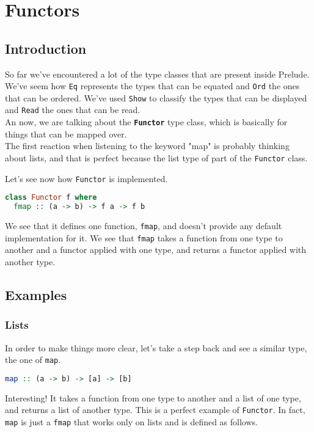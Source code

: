 \newpage
\chapter{Functors}
\section{Introduction}
So far we've encountered a lot of the type classes that are present inside Prelude. We've seem how \texttt{Eq} represents the types that can be equated and \texttt{Ord} the ones that can be ordered. We've used \texttt{Show} to classify the types that can be displayed and \texttt{Read} the ones that can be read. \\
An now, we are talking about the \textbf{\texttt{Functor}} type class, which is basically for things that can be mapped over. \\
The first reaction when listening to the keyword "map" is probably thinking about lists, and that is perfect because the list type of part of the \texttt{Functor} class.
\linebreak \linebreak

Let's see now how \texttt{Functor} is implemented.

\begin{lstlisting}[language=haskell]
class Functor f where
  fmap :: (a -> b) -> f a -> f b
\end{lstlisting}

We see that it defines one function, \texttt{fmap}, and doesn't provide any default implementation for it. We see that \texttt{fmap} takes a function from one type to another and a functor applied with one type, and returns a functor applied with another type. \\


\section{Examples}
\subsection{Lists}
In order to make things more clear, let's take a step back and see a similar type, the one of \texttt{map}.

\begin{lstlisting}[language=haskell]
map :: (a -> b) -> [a] -> [b]
\end{lstlisting}

Interesting! It takes a function from one type to another and a list of one type, and returns a list of another type. This is a perfect example of \texttt{Functor}. In fact, \texttt{map} is just a \texttt{fmap} that works only on lists and is defined as follows.

